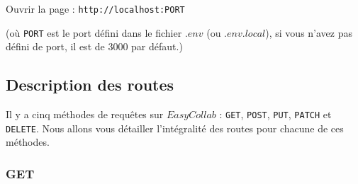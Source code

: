 \documentclass[11pt, letterpaper]{article}
\begin{document}
Ouvrir la page : \verb+http://localhost:PORT+

(où \verb+PORT+ est le port défini dans le fichier $.env$ (ou $.env.local$), si vous n’avez pas défini de port, il est de $3000$ par défaut.)

\subsection{Description des routes}

Il y a cinq méthodes de requêtes sur $EasyCollab$ : \verb+GET+, \verb+POST+, \verb+PUT+, \verb+PATCH+ et \verb+DELETE+. Nous allons vous détailler l’intégralité des routes pour chacune de ces méthodes.

\subsubsection*{\textbf{GET}} 
\end{document}
